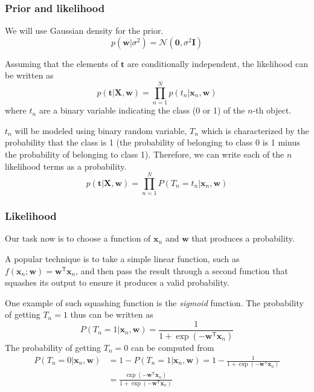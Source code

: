 \documentclass[english,10pt,aspectratio=169,fleqn]{beamer}
\begin{document}
\begin{frame} %
\frametitle{Prior and likelihood}

We will use Gaussian density for the prior.
\begin{equation*}
p(\mathbf{w} | \sigma^2) = \mathcal{N}(\mathbf{0},\sigma^2\mathbf{I})
\end{equation*}

Assuming that the elements of $\mathbf{t}$ are conditionally independent,
the likelihood can be written as
\begin{equation*}
p(\mathbf{t} | \mathbf{X}, \mathbf{w}) = \prod_{n=1}^{N}
p(t_{n} | \mathbf{x}_{n}, \mathbf{w})
\end{equation*}
where $t_{n}$ are a binary variable indicating the class (0 or 1) of the $n$-th
object.

$t_{n}$ will be modeled using binary random variable, $T_{n}$ which is characterized
by the probability that the class is 1 (the probability of belonging to class 0 is
1 minus the probability of belonging to class 1). Therefore, we can write each of
the $n$ likelihood terms as a probability.
\begin{equation*}
p(\mathbf{t} | \mathbf{X}, \mathbf{w}) = \prod_{n=1}^{N}
P(T_{n}=t_{n} | \mathbf{x}_{n}, \mathbf{w})
\end{equation*}

\end{frame}


\begin{frame}
\frametitle{Likelihood}

Our task now is to choose a function of $\mathbf{x}_{n}$ and $\mathbf{w}$
that produces a probability.

A popular technique is to take a simple linear
function, such as
$f(\mathbf{x}_{n};\mathbf{w}) = \mathbf{w}^{\mathsf{T}}\mathbf{x}_{n}$,
and then pass the result through a second function that squashes its output
to ensure it produces a valid probability.

One example of such squashing function is the \textit{sigmoid} function.
The probability of getting $T_{n}=1$ thus can be written as
\begin{equation*}
P(T_{n}=1 | \mathbf{x}_{n},\mathbf{w}) =
\frac{1}{1 + \exp(-\mathbf{w}^{\mathsf{T}}\mathbf{x}_{n})}
\end{equation*}
The probability of getting $T_{n}=0$ can be computed from
\begin{align*}
P(T_{n}=0 | \mathbf{x}_{n},\mathbf{w}) & = 1 - P(T_{n}=1 | \mathbf{x}_{n},\mathbf{w})
 = 1 - \frac{1}{1 + \exp(-\mathbf{w}^{\mathsf{T}}\mathbf{x}_{n})} \\
& = \frac{\exp(-\mathbf{w}^{\mathsf{T}}\mathbf{x}_{n})}%
{1 + \exp(-\mathbf{w}^{\mathsf{T}}\mathbf{x}_{n})}
\end{align*}

\end{frame}
\end{document}
